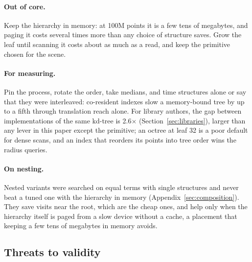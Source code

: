 \paragraph{Out of core.} Keep the hierarchy in memory: at 100M points it is a few tens of megabytes, and paging it costs several times more than any choice of structure saves. Grow the leaf until scanning it costs about as much as a read, and keep the primitive chosen for the scene.

\paragraph{For measuring.} Pin the process, rotate the order, take medians, and time structures alone or say that they were interleaved: co-resident indexes slow a memory-bound tree by up to a fifth through translation reach alone. For library authors, the gap between implementations of the same kd-tree is 2.6$\times$ (Section~\ref{sec:libraries}), larger than any lever in this paper except the primitive; an octree at leaf 32 is a poor default for dense scans, and an index that reorders its points into tree order wins the radius queries.

\paragraph{On nesting.} Nested variants were searched on equal terms with single structures and never beat a tuned one with the hierarchy in memory (Appendix~\ref{sec:composition}). They save visits near the root, which are the cheap ones, and help only when the hierarchy itself is paged from a slow device without a cache, a placement that keeping a few tens of megabytes in memory avoids.

\subsection{Threats to validity}

